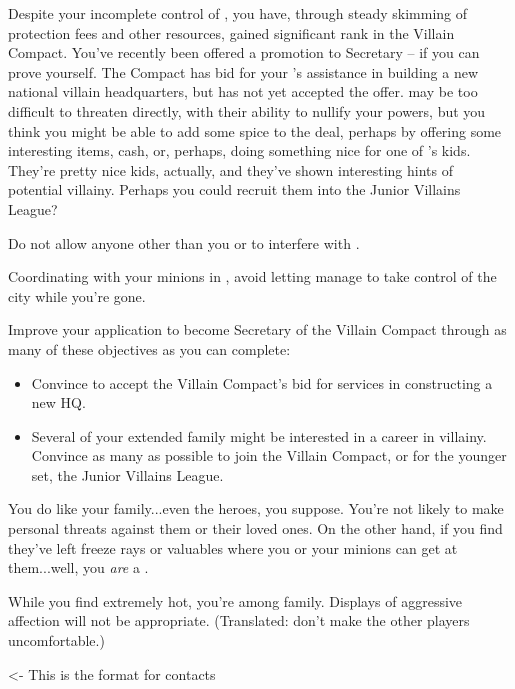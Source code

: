 \documentclass[char]{LRSguildcamp1}
\begin{document}
Despite your incomplete control of \pCityO{}, you have, through steady skimming of protection fees and other resources, gained significant rank in the Villain Compact.  You've recently been offered a promotion to Secretary -- if you can prove yourself.  The Compact has bid for your \cArchitect{\sibling} \cArchitect{}'s assistance in building a new national villain headquarters, but \cArchitect{} has not yet accepted the offer.  \cArchitect{} may be too difficult to threaten directly, with their ability to nullify your powers, but you think you might be able to add some spice to the deal, perhaps by offering some interesting items, cash, or, perhaps, doing something nice for one of \cArchitect{}'s kids.  They're pretty nice kids, actually, and they've shown interesting hints of potential villainy.  Perhaps you could recruit them into the Junior Villains League?

\begin{itemz}[Goals]
	\item Do not allow anyone other than you or \cOS{} to interfere with \pCityO{}.
	\item Coordinating with your minions in \pCityO{}, avoid letting \cOS{} manage to take control of the city while you're gone.
	\item Improve your application to become Secretary of the Villain Compact through as many of these objectives as you can complete:
	\begin{itemize}
		\item Convince \cArchitect{} to accept the Villain Compact's bid for \cArchitect{\their} services in constructing a new HQ.
		\item Several of your extended family might be interested in a career in villainy.  Convince as many as possible to join the Villain Compact, or for the younger set, the Junior Villains League.
	\end{itemize}
\end{itemz}

\begin{itemz}[Notes]
	\item You do like your family...even the heroes, you suppose.  You're not likely to make personal threats against them or their loved ones.  On the other hand, if you find they've left freeze rays or valuables where you or your minions can get at them...well, you \emph{are} a \cOldest{\villain}.
	\item While you find \cOS{} extremely hot, you're among family.  Displays of aggressive affection will not be appropriate.  (Translated: don't make the other players uncomfortable.)
\end{itemz}

\begin{contacts}
	\contact{} <- This is the format for contacts 
\end{contacts}
\end{document}
